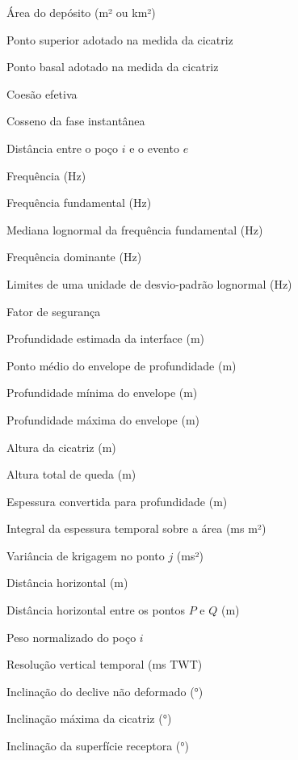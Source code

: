 \begin{simbolos}
  \item[$A$] Área do depósito (m² ou km²)
  \item[$A_s$] Ponto superior adotado na medida da cicatriz
  \item[$B_s$] Ponto basal adotado na medida da cicatriz
  \item[$c'$] Coesão efetiva
  \item[$C(t)$] Cosseno da fase instantânea
  \item[$d_{i,e}$] Distância entre o poço $i$ e o evento $e$
  \item[$f$] Frequência (Hz)
  \item[$f_0$] Frequência fundamental (Hz)
  \item[$\widetilde f_0$] Mediana lognormal da frequência fundamental (Hz)
  \item[$f_{\mathrm{dom}}$] Frequência dominante (Hz)
  \item[$f_{\pm1\sigma}$] Limites de uma unidade de desvio-padrão lognormal (Hz)
  \item[$FS$] Fator de segurança
  \item[$H$] Profundidade estimada da interface (m)
  \item[$H_c$] Ponto médio do envelope de profundidade (m)
  \item[$H_{\min}$] Profundidade mínima do envelope (m)
  \item[$H_{\max}$] Profundidade máxima do envelope (m)
  \item[$H_s$] Altura da cicatriz (m)
  \item[$H_t$] Altura total de queda (m)
  \item[$h$] Espessura convertida para profundidade (m)
  \item[$I$] Integral da espessura temporal sobre a área (ms m²)
  \item[$K_j$] Variância de krigagem no ponto $j$ (ms²)
  \item[$L$] Distância horizontal (m)
  \item[$L_{P-Q}$] Distância horizontal entre os pontos $P$ e $Q$ (m)
  \item[$p_i$] Peso normalizado do poço $i$
  \item[$R_{\mathrm{TWT}}$] Resolução vertical temporal (ms TWT)
  \item[$S$] Inclinação do declive não deformado (°)
  \item[$S_s$] Inclinação máxima da cicatriz (°)
  \item[$S_t$] Inclinação da superfície receptora (°)

\end{simbolos}

